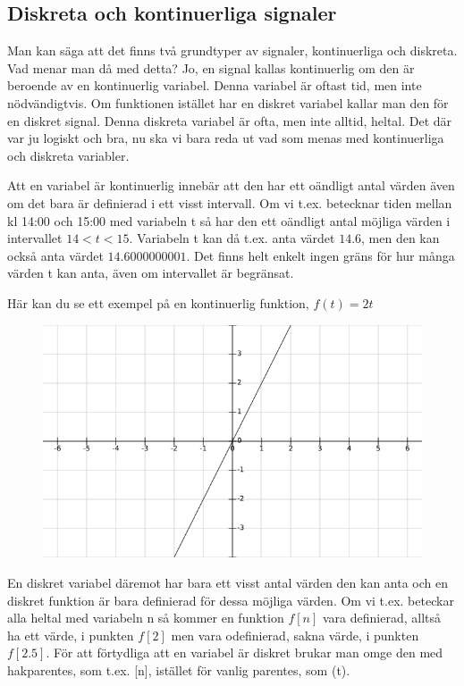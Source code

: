 \documentclass{article}
\begin{document}
\subsection{Diskreta och kontinuerliga signaler}

Man kan säga att det finns två grundtyper av signaler, kontinuerliga och
diskreta. Vad menar man då med detta? Jo, en signal kallas kontinuerlig om
den är beroende av en kontinuerlig variabel. Denna variabel är oftast tid,
men inte nödvändigtvis. Om funktionen istället har en diskret variabel kallar
man den för en diskret signal. Denna diskreta variabel är ofta, men inte
alltid, heltal. Det där var ju logiskt och bra, nu ska vi bara reda ut vad
som menas med kontinuerliga och diskreta variabler.

Att en variabel är kontinuerlig innebär att den har ett oändligt antal värden
även om det bara är definierad i ett visst intervall. Om vi t.ex. betecknar
tiden mellan kl 14:00 och 15:00 med variabeln t så har den ett oändligt antal
möjliga värden i intervallet $14 < t < 15$. Variabeln t kan då t.ex. anta
värdet $14.6$, men den kan också anta värdet $14.6000000001$. Det finns helt
enkelt ingen gräns för hur många värden t kan anta, även om intervallet är
begränsat.

Här kan du se ett exempel på en kontinuerlig funktion, $f(t)=2t$
\begin{figure}[ht]
\centerline{\includegraphics[scale=0.55]{image06}}
\caption{}
\label{}
\end{figure}
\newpage
En diskret variabel däremot har bara ett visst antal värden den kan anta och
en diskret funktion är bara definierad för dessa möjliga värden. Om vi t.ex.
beteckar alla heltal med variabeln n så kommer en funktion $f[n]$ vara
definierad, alltså ha ett värde, i punkten $f[2]$ men vara odefinierad, sakna
värde, i punkten $f[2.5]$. För att förtydliga att en variabel är diskret
brukar man omge den med hakparentes, som t.ex. [n], istället för vanlig
parentes, som (t).
\end{document}
